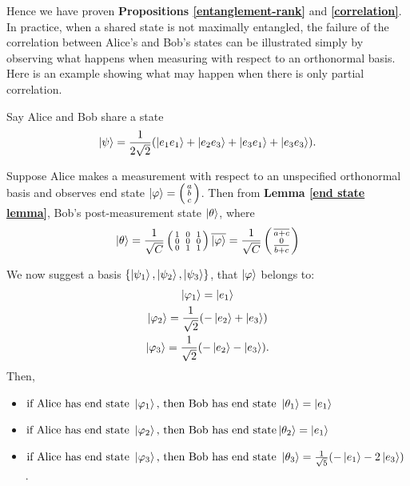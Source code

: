 
Hence we have proven {\bf{Propositions} \ref{entanglement-rank}} and \textbf{\ref{correlation}}. In practice, when a shared state is not maximally entangled, the failure of the correlation between Alice's and Bob's states can be illustrated simply by observing what happens when measuring with respect to an orthonormal basis.  Here is an example showing what may happen when there is only partial correlation.
\begin{example}
\label{example rank not full}
Say Alice and Bob share a state $$\ket{\psi}=\frac{1}{2\sqrt{2}}(\ket{e_1 e_1}+\ket{e_2 e_3}+\ket{e_3 e_1}+\ket{e_3 e_3}).$$

Suppose Alice makes a measurement with respect to an unspecified orthonormal basis and observes end state  $\ket{\varphi}=\left(\begin{smallmatrix}a\\b\\c\end{smallmatrix}\right)$.  Then from \textbf{Lemma \ref{end state lemma}}, Bob's post-measurement state $\ket{\theta}$, where 
\begin{equation*} \label{eqn:example-theta}
\ket{\theta}=\frac{1}{\sqrt{C}}\left(\begin{smallmatrix}
1 && 0 && 1\\
0 && 0 && 0\\
0 && 1 && 1\\
\end{smallmatrix}\right)\overline{\ket{\varphi}}=\frac{1}{\sqrt{C}}\left(\begin{smallmatrix}
\overline{a+c}\\
0\\
\overline{b+c}\end{smallmatrix}\right)
\end{equation*}

 We now suggest a basis $\{\ket{\psi_1}, \ket{\psi_2}, \ket{\psi_3}\}$, that $\ket{\varphi}$ belongs to:
    \begin{gather}
    \ket{\varphi_1}=\ket{e_1}\\ \ket{\varphi_2}=\frac{1}{\sqrt{2}}(-\ket{e_2}+\ket{e_3})\\
    \ket{\varphi_3}=\frac{1}{\sqrt{2}}(-\ket{e_2}-\ket{e_3}).
    \end{gather}
Then, 
\begin{itemize}
\item $\textrm{if Alice has end state }\ket{\varphi_1} \textrm{, then Bob has end state } \ket{\theta_1}=\ket{e_1}$
\item $\textrm{if Alice has end state }\ket{\varphi_2} \textrm{, then Bob has end state} \ket{\theta_2}=\ket{e_1}$
\item $\textrm{if Alice has end state }\ket{\varphi_3} \textrm{, then Bob has end state }\ket{\theta_3}=\frac{1}{\sqrt{5}}(-\ket{e_1}-2\ket{e_3})$.
\end{itemize}



\end{example}
